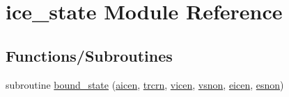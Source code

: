 \hypertarget{namespaceice__state}{
\section{ice\_\-state Module Reference}
\label{namespaceice__state}
}
\subsection*{Functions/Subroutines}
\begin{DoxyCompactItemize}
\item 
subroutine \hyperlink{namespaceice__state_a78d0e2cfa0bf0b06213526515ea5bb15}{bound\_\-state} (\hyperlink{namespaceice__state_a38df7a3870d9a3a425b31808503ba98e}{aicen}, \hyperlink{namespaceice__state_a52d1c7e6719d1a295a7e5fab8b867dd1}{trcrn}, \hyperlink{namespaceice__state_aa85616e03769af4afb0166070aa7cc8f}{vicen}, \hyperlink{namespaceice__state_acd313a058964928092cbc75f7689cef5}{vsnon}, \hyperlink{namespaceice__state_ae98b075caabb73fcd86ce51eb76849b4}{eicen}, \hyperlink{namespaceice__state_aeb23ce1b6f981d016e447371d318a10c}{esnon})
\end{DoxyCompactItemize}
